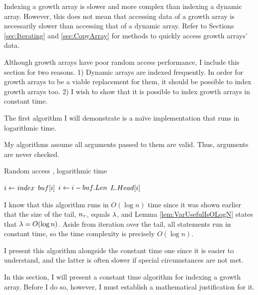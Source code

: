 \HdrGrowthArrayImpl

Indexing a growth array is slower and more complex than indexing a dynamic array. However, this does not mean that accessing data of a growth array is necessarily slower than accessing that of a dynamic array. Refer to Sections \ref{sec:Iterating} and \ref{sec:CopyArray} for methods to quickly access growth arrays' data.

Although growth arrays have poor random access performance, I include this section for two reasons. 1) Dynamic arrays are indexed frequently. In order for growth arrays to be a viable replacement for them, it should be possible to index growth arrays too. 2) I wish to show that it is possible to index growth arrays in constant time.

\HdrLogarithmicImpl

The first algorithm I will demonstrate is a na\"{i}ve implementation that runs in logarithmic time.

{\HdrNote} My algorithms assume all arguments passed to them are valid. Thus, arguments are never checked.

\begin{algorithm}[H]
	\caption{Random access \TextGrowthArray, logarithmic time}
	\begin{algorithmic}
		\Function{$\FuncGetItem$}{$\VarList,\ \ParamIndex$}
			\State $i \gets index$
					\State \Return $buf[i]$
				\EndIf
				\State $i \gets i - buf.Len$
			\EndFor
			\State \Return $L.Head[i]$
		\EndFunction
	\end{algorithmic}
\end{algorithm}

I know that this algorithm runs in $O(\log n)$ time since it was shown earlier that the size of the tail, $n_\tau$, equals $\lambda$, and Lemma \ref{lem:VarUsefulIsOLogN} states that $\lambda = O(\log n)$. Aside from iteration over the tail, all statements run in constant time, so the time complexity is precisely $O(\log n)$.

I present this algorithm alongside the constant time one since it is easier to understand, and the latter is often slower if special circumstances are not met.

\HdrConstantImpl

In this section, I will present a constant time algorithm for indexing a growth array. Before I do so, however, I must establish a mathematical justification for it.

